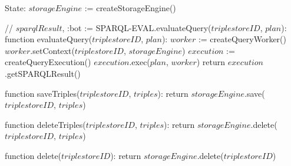 State:
    $storageEngine$ := createStorageEngine()
    
// {$sparqlResult$, :bot} := \textrm{SPARQL-EVAL}.evaluateQuery($triplestoreID$, $plan$):
function evaluateQuery($triplestoreID$, $plan$):
    $worker$ := createQueryWorker()
    $worker$.setContext($triplestoreID$, $storageEngine$)
    $execution$ := createQueryExecution()
    $execution$.exec($plan$, $worker$)
    return $execution$.getSPARQLResult()

function saveTriples($triplestoreID$, $triples$):
    return $storageEngine$.save($triplestoreID$, $triples$)

function deleteTriples($triplestoreID$, $triples$):
    return $storageEngine$.delete($triplestoreID$, $triples$)

function delete($triplestoreID$):
    return $storageEngine$.delete($triplestoreID$)